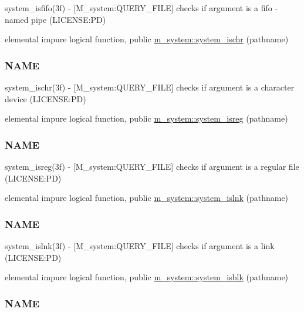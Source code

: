 \begin{DoxyCompactItemize}
\begin{DoxyCompactList}
system\+\_\+isfifo(3f) -\/ \mbox{[}M\+\_\+system\+:Q\+U\+E\+R\+Y\+\_\+\+F\+I\+LE\mbox{]} checks if argument is a fifo -\/ named pipe (L\+I\+C\+E\+N\+SE\+:PD) \end{DoxyCompactList}\item 
elemental impure logical function, public \mbox{\hyperlink{namespacem__system_a49f1d027d438aab86024660b0802768f}{m\+\_\+system\+::system\+\_\+ischr}} (pathname)
\begin{DoxyCompactList}\small\item\em \subsubsection*{N\+A\+ME}

system\+\_\+ischr(3f) -\/ \mbox{[}M\+\_\+system\+:Q\+U\+E\+R\+Y\+\_\+\+F\+I\+LE\mbox{]} checks if argument is a character device (L\+I\+C\+E\+N\+SE\+:PD) \end{DoxyCompactList}\item 
elemental impure logical function, public \mbox{\hyperlink{namespacem__system_a8ea0d0430227af61b8083b4e7d6e597d}{m\+\_\+system\+::system\+\_\+isreg}} (pathname)
\begin{DoxyCompactList}\small\item\em \subsubsection*{N\+A\+ME}

system\+\_\+isreg(3f) -\/ \mbox{[}M\+\_\+system\+:Q\+U\+E\+R\+Y\+\_\+\+F\+I\+LE\mbox{]} checks if argument is a regular file (L\+I\+C\+E\+N\+SE\+:PD) \end{DoxyCompactList}\item 
elemental impure logical function, public \mbox{\hyperlink{namespacem__system_a268d0cd27be36527894fe2cae0f1b9f6}{m\+\_\+system\+::system\+\_\+islnk}} (pathname)
\begin{DoxyCompactList}\small\item\em \subsubsection*{N\+A\+ME}

system\+\_\+islnk(3f) -\/ \mbox{[}M\+\_\+system\+:Q\+U\+E\+R\+Y\+\_\+\+F\+I\+LE\mbox{]} checks if argument is a link (L\+I\+C\+E\+N\+SE\+:PD) \end{DoxyCompactList}\item 
elemental impure logical function, public \mbox{\hyperlink{namespacem__system_a1294b8d8b4910261c0a0991bf668ab67}{m\+\_\+system\+::system\+\_\+isblk}} (pathname)
\begin{DoxyCompactList}\small\item\em \subsubsection*{N\+A\+ME}


\end{DoxyCompactList}
\end{DoxyCompactItemize}
